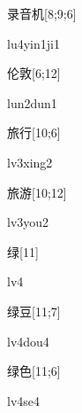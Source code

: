 \begin{verbete}[lu4yin1ji1]{录音机}[8;9;6]
\begin{pronuncia}{lu4yin1ji1}
\end{pronuncia}
\end{verbete}

\begin{verbete}{伦敦}[6;12]
\begin{pronuncia}{lun2dun1}
\end{pronuncia}
\end{verbete}

\begin{verbete}[lv3xing2]{旅行}[10;6]
\begin{pronuncia}{lv3xing2}
\end{pronuncia}
\end{verbete}

\begin{verbete}[lv3you2]{旅游}[10;12]
\begin{pronuncia}{lv3you2}
\end{pronuncia}
\end{verbete}

\begin{verbete}[lv4]{绿}[11]
\begin{pronuncia}{lv4}
\end{pronuncia}
\end{verbete}

\begin{verbete}[lv4dou4]{绿豆}[11;7]
\begin{pronuncia}{lv4dou4}
\end{pronuncia}
\end{verbete}

\begin{verbete}[lv4se4]{绿色}[11;6]
\begin{pronuncia}{lv4se4}
\end{pronuncia}
\end{verbete}

